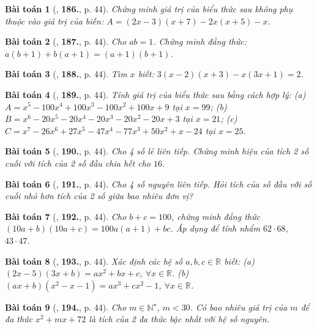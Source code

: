 \documentclass{article}
\numberwithin{equation}{section}
\newtheorem{baitoan}{Bài toán}
\begin{document}
\begin{baitoan}[\cite{Tuyen_Toan_7}, \textbf{186.}, p. 44]
	Chứng minh giá trị của biểu thức sau không phụ thuộc vào giá trị của biến: $A = (2x - 3)(x + 7) - 2x(x + 5) - x$. 
\end{baitoan}

\begin{baitoan}[\cite{Tuyen_Toan_7}, \textbf{187.}, p. 44]
	Cho $ab = 1$. Chứng minh đẳng thức: $a(b + 1) + b(a + 1) = (a + 1)(b + 1)$.
\end{baitoan}

\begin{baitoan}[\cite{Tuyen_Toan_7}, \textbf{188.}, p. 44]
	Tìm $x$ biết: $3(x - 2)(x + 3) - x(3x + 1) = 2$.
\end{baitoan}

\begin{baitoan}[\cite{Tuyen_Toan_7}, \textbf{189.}, p. 44]
	Tính giá trị của biểu thức sau bằng cách hợp lý: (a) $A = x^5 - 100x^4 + 100x^3 - 100x^2 + 100x + 9$ tại $x = 99$; (b) $B = x^6 - 20x^5 - 20x^4 - 20x^3 - 20x^2 - 20x + 3$ tại $x = 21$; (c) $C = x^7 - 26x^6 + 27x^5 - 47x^4 - 77x^3 + 50x^2 + x - 24$ tại $x = 25$.
\end{baitoan}

\begin{baitoan}[\cite{Tuyen_Toan_7}, \textbf{190.}, p. 44]
	Cho 4 số lẻ liên tiếp. Chứng minh hiệu của tích 2 số cuối với tích của 2 số đầu chia hết cho $16$.
\end{baitoan}

\begin{baitoan}[\cite{Tuyen_Toan_7}, \textbf{191.}, p. 44]
	Cho 4 số nguyên liên tiếp. Hỏi tích của số đầu với số cuối nhỏ hơn tích của 2 số giữa bao nhiêu đơn vị?
\end{baitoan}

\begin{baitoan}[\cite{Tuyen_Toan_7}, \textbf{192.}, p. 44]
	Cho $b + c = 100$, chứng minh đẳng thức $(10a + b)(10a + c) = 100a(a + 1) + bc$. Áp dụng để tính nhẩm $62\cdot68$, $43\cdot47$.
\end{baitoan}

\begin{baitoan}[\cite{Tuyen_Toan_7}, \textbf{193.}, p. 44]
	Xác định các hệ số $a,b,c\in\mathbb{R}$ biết: (a) $(2x - 5)(3x + b) = ax^2 + bx + c$, $\forall x\in\mathbb{R}$. (b) $(ax + b)(x^2 - x - 1) = ax^3 + cx^2 - 1$, $\forall x\in\mathbb{R}$.
\end{baitoan}

\begin{baitoan}[\cite{Tuyen_Toan_7}, \textbf{194.}, p. 44]
	Cho $m\in\mathbb{N}^\star$, $m < 30$. Có bao nhiêu giá trị của $m$ để đa thức $x^2 + mx + 72$ là tích của 2 đa thức bậc nhất với hệ số nguyên.
\end{baitoan}
\end{document}
